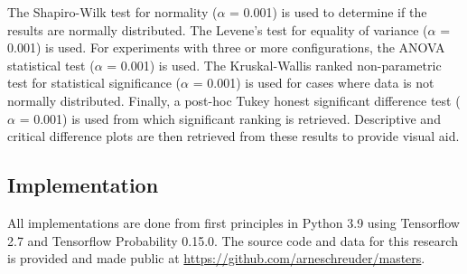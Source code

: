 The Shapiro-Wilk test for normality \cite{ref:shapiro:1965} ($\alpha$ = 0.001) is used to determine if the results are normally distributed. The Levene's test for equality of variance \cite{ref:levene:1961} ($\alpha$ = 0.001) is used. For experiments with three or more configurations, the \acs{ANOVA} statistical test \cite{ref:fisher:1921} ($\alpha$ = 0.001) is used. The Kruskal-Wallis ranked non-parametric test \cite{ref:kruskal:1952} for statistical significance ($\alpha$ = 0.001) is used for cases where data is not normally distributed. Finally, a post-hoc Tukey honest significant difference test \cite{ref:tukey:1949} ($\alpha$ = 0.001) is used from which significant ranking is retrieved. Descriptive and critical difference plots are then retrieved from these results to provide visual aid.

\subsection{Implementation}\label{sec:methodology:implementation}

All implementations are done from first principles in Python 3.9 using Tensorflow 2.7 and Tensorflow Probability 0.15.0. The source code and data for this research is provided and made public at \url{https://github.com/arneschreuder/masters}.